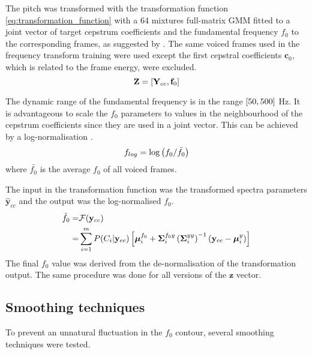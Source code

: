 The pitch was transformed with the transformation function \eqref{eq:transformation_function} with a 64 mixtures full-matrix GMM fitted to a joint vector of target cepstrum coefficients and the fundamental frequency $f_0$ to the corresponding frames, as suggested by \cite{najjary03new}. The same voiced frames used in the frequency transform training were used except the first cepstral coefficients $\mathbf{c}_0$, which is related to the frame energy, were excluded. 
\begin{equation}
	\mathbf{Z} = \left[\mathbf{Y}_{cc}, \mathbf{f}_{0}\right]
\end{equation}

The dynamic range of the fundamental frequency is in the range $\left[50,500\right]$ Hz. It is advantageous to scale the $f_0$ parameters to values in the neighbourhood of the cepstrum coefficients since they are used in a joint vector. This can be achieved by a log-normalisation \cite{najjary03new}.
\begin{equation}
	f_{log} = \log \left(f_0/\bar{f_0}\right)
\end{equation}
where $\bar{f_0}$ is the average $f_0$ of all voiced frames.

The input in the transformation function was the transformed spectra parameters $\hat{\mathbf{y}}_{cc}$ and the output was the log-normalised $f_0$.
\begin{equation}
	\label{eq:pitch_transformation}
	\begin{split}
		\hat{f}_0 =& \mathcal F(\mathbf{y}_{cc})\\
		=& \sum_{i=1}^{m}P(C_i \vert \mathbf{y}_{cc}) \left[\boldsymbol{\mu}_i^{f_0} + \mathbf{\Sigma}_i^{f_0y} \left(\mathbf{\Sigma}_i^{yy}\right)^{-1} (\mathbf{y}_{cc}-\boldsymbol{\mu}_i^y)\right]
	\end{split}
\end{equation}
The final $f_0$ value was derived from the de-normalisation of the transformation output. The same procedure was done for all versions of the $\mathbf{z}$ vector.

\subsection{Smoothing techniques} %
\label{sub:smoothing_techniques}
To prevent an unnatural fluctuation in the $f_0$ contour, several smoothing techniques were tested. 


